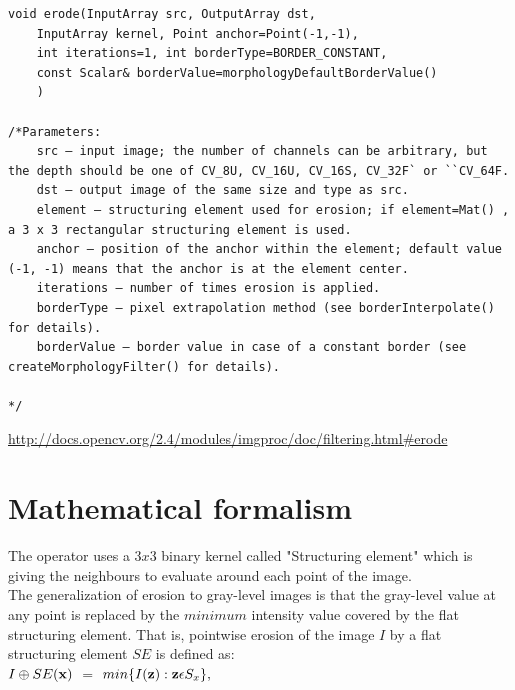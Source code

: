 \documentclass[12pt,a4paper]{article}
\begin{document}
\lstset{language=C++}
\begin{lstlisting}
void erode(InputArray src, OutputArray dst, 
	InputArray kernel, Point anchor=Point(-1,-1), 
	int iterations=1, int borderType=BORDER_CONSTANT, 
	const Scalar& borderValue=morphologyDefaultBorderValue() 
	)

/*Parameters:	
    src – input image; the number of channels can be arbitrary, but the depth should be one of CV_8U, CV_16U, CV_16S, CV_32F` or ``CV_64F.
    dst – output image of the same size and type as src.
    element – structuring element used for erosion; if element=Mat() , a 3 x 3 rectangular structuring element is used.
    anchor – position of the anchor within the element; default value (-1, -1) means that the anchor is at the element center.
    iterations – number of times erosion is applied.
    borderType – pixel extrapolation method (see borderInterpolate() for details).
    borderValue – border value in case of a constant border (see createMorphologyFilter() for details).

*/
\end{lstlisting}

\url{http://docs.opencv.org/2.4/modules/imgproc/doc/filtering.html#erode}

\section*{Mathematical formalism}

The operator uses a $3x3$ binary kernel called "Structuring element" which is giving the neighbours to evaluate around each point of the image. \\

The generalization of erosion to gray-level images is that the gray-level value at any point is replaced by the $minimum$ intensity value covered by the flat structuring element. That is, pointwise erosion of the image $I$ by a flat structuring element $SE$ is defined as:\\


\centering
$\displaystyle I \oplus SE (\bf x )$ 	$\textstyle =$ 	$\displaystyle min \{I({\bf z}): {\bf z} \epsilon S_x \},$

\vspace{0.5cm}
\end{document}
